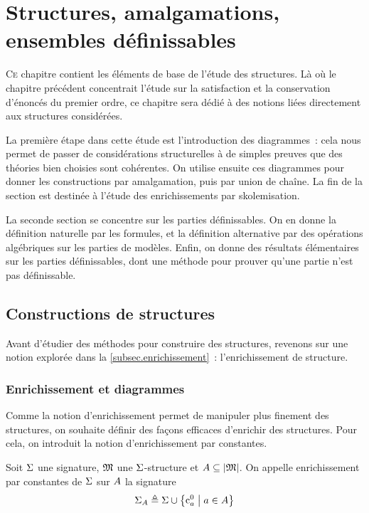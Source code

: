 \chapter[Constructions et ensembles définissables]{Structures, amalgamations,
  ensembles définissables}
\label{chp.struct.mod}

\minitoc

\lettrine{C}{e} chapitre contient les éléments de base de l'étude des
structures. Là où le chapitre précédent concentrait l'étude sur la
satisfaction et la conservation d'énoncés du premier ordre, ce chapitre sera
dédié à des notions liées directement aux structures considérées.

La première étape dans cette étude est l'introduction des diagrammes~: cela nous
permet de passer de considérations structurelles à de simples preuves que des
théories bien choisies sont cohérentes. On utilise ensuite ces diagrammes pour
donner les constructions par amalgamation, puis par union de chaîne. La fin de
la section est destinée à l'étude des enrichissements par skolemisation.

La seconde section se concentre sur les parties définissables. On en donne la
définition naturelle par les formules, et la définition alternative par des
opérations algébriques sur les parties de modèles. Enfin, on donne des résultats
élémentaires sur les parties définissables, dont une méthode pour prouver qu'une
partie n'est pas définissable.

\section{Constructions de structures}

Avant d'étudier des méthodes pour construire des structures, revenons sur une
notion explorée dans la \cref{subsec.enrichissement}~: l'enrichissement de
structure.

\subsection{Enrichissement et diagrammes}

Comme la notion d'enrichissement permet de manipuler plus finement des
structures, on souhaite définir des façons efficaces d'enrichir des structures.
Pour cela, on introduit la notion d'enrichissement par constantes.

\begin{definition}
  Soit $\Sigma$ une signature, $\mathfrak{M}$ une $\Sigma$-structure et
  $A\subseteq\left\vert \mathfrak{M}\right\vert$. On appelle enrichissement par constantes de $\Sigma$
  sur $A$ la signature
  \[\Sigma_{A}\triangleq \Sigma\cup\left\{ \mathrm{c}_a^0 \;\middle\vert\; a \in A \right\}\]
  \index[notation]{$\SignP{\varPt}$}
\end{definition}

